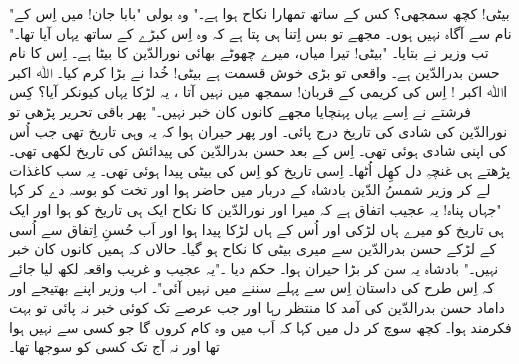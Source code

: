 "بیٹی! کچھ سمجھی؟ کس  کے ساتھ تمھارا نکاح ہوا ہے۔"
وہ بولی "بابا جان! میں اِس کے نام سے آگاہ نہیں ہوں۔ مجھے تو بس اِتنا ہی پتا ہے کہ وہ اِس کبڑے کے ساتھ یہاں آیا تھا۔"
تب وزیر نے بتایا۔
"بیٹی! تیرا  میاں، میرے چھوٹے بھائی  نورالدّین کا بیٹا ہے۔ اِس کا نام حسن بدرالدّین ہے۔ واقعی تو بڑی خوش قسمت ہے بیٹی! خُدا نے بڑا کرم کیا۔ ﷲ اکبر اﷲ اکبر ! اِس کی کریمی کے قربان! سمجھ  میں نہیں آتا ، یہ لڑکا یہاں کیونکر  آیا؟ کِس فرشتے نے اِسے یہاں پہنچایا مجھے کانوں کان خبر نہیں۔"
پھر باقی تحریر پڑھی تو نورالدّین کی شادی کی تاریخ درج پائی۔ اور پھر حیران ہوا کہ یہ وہی تاریخ تھی جب اُس کی اپنی شادی ہوئی تھی۔ اِس کے بعد حسن بدرالدّین کی پیدائش کی تاریخ لکھی تھی۔ پڑھتے ہی غنچہِ دل کھِل اُٹھا۔ اِسی تاریخ کو اِس کی بیٹی پیدا ہوئی تھی۔
یہ سب کاغذات لے کر وزیر شمسُ الدّین بادشاہ کے دربار میں حاضر ہوا اور تخت کو بوسہ دے کر کہا "جہاں پناہ! یہ عجیب اتفاق ہے کہ میرا اور نورالدّین کا نکاح ایک ہی تاریخ کو ہوا اور ایک ہی تاریخ کو میرے ہاں لڑکی اور اُس کے ہاں لڑکا پیدا ہوا اور اَب حُسنِ اِتفاق سے اُسی کے لڑکے  حسن بدرالدّین سے میری بیٹی کا نکاح ہو گیا۔ حالاں کہ ہمیں کانوں کان خبر نہیں۔"
بادشاہ یہ سن کر بڑا حیران ہوا۔ حکم دیا ۔"یہ عجیب و غریب واقعہ لکھ لیا جائے کہ اِس طرح کی داستان اِس سے پہلے سننے میں نہیں آئی"۔ اب وزیر اپنے بھتیجے اور داماد  حسن بدرالدّین کی آمد کا منتظر رہا اور جب عرصے تک کوئی خبر نہ پائی تو بہت فکرمند ہوا۔ کچھ سوچ کر دل میں کہا کہ اَب میں وہ کام کروں گا جو کسی سے نہیں ہوا تھا اور نہ آج تک کسی کو سوجھا تھا۔





